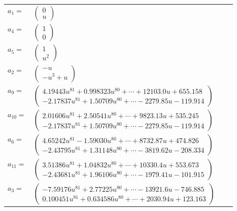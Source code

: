 \documentclass[1p]{elsarticle_modified}
\theoremstyle{definition}
\begin{document}
\begin{tabular}{m{7pt} m{180pt} m{7pt} m{180pt} }
\flushright $a_{1}=$&$\begin{pmatrix}0\\u\end{pmatrix}$ \\
\flushright $a_{4}=$&$\begin{pmatrix}1\\0\end{pmatrix}$ \\
\flushright $a_{5}=$&$\begin{pmatrix}1\\u^2\end{pmatrix}$ \\
\flushright $a_{2}=$&$\begin{pmatrix}- u\\- u^3+u\end{pmatrix}$ \\
\flushright $a_{9}=$&$\begin{pmatrix}4.19443 u^{81}+0.998323 u^{80}+\cdots+12103.0 u+655.158\\-2.17837 u^{81}+1.50709 u^{80}+\cdots-2279.85 u-119.914\end{pmatrix}$ \\
\flushright $a_{10}=$&$\begin{pmatrix}2.01606 u^{81}+2.50541 u^{80}+\cdots+9823.13 u+535.245\\-2.17837 u^{81}+1.50709 u^{80}+\cdots-2279.85 u-119.914\end{pmatrix}$ \\
\flushright $a_{6}=$&$\begin{pmatrix}4.65242 u^{81}-1.59030 u^{80}+\cdots+8732.87 u+474.826\\-2.43795 u^{81}+1.31148 u^{80}+\cdots-3819.62 u-208.334\end{pmatrix}$ \\
\flushright $a_{11}=$&$\begin{pmatrix}3.51386 u^{81}+1.04832 u^{80}+\cdots+10330.4 u+553.673\\-2.43681 u^{81}+1.96106 u^{80}+\cdots-1979.41 u-101.915\end{pmatrix}$ \\
\flushright $a_{3}=$&$\begin{pmatrix}-7.59176 u^{81}+2.77225 u^{80}+\cdots-13921.6 u-746.885\\0.100451 u^{81}+0.634586 u^{80}+\cdots+2030.94 u+123.163\end{pmatrix}$ \\

\end{tabular}
\end{document}
